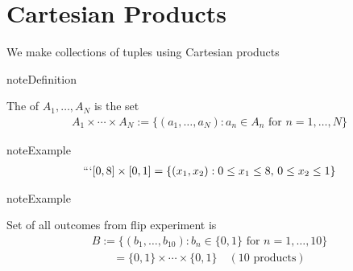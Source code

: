 \documentclass[letterpaper,10pt,english]{jupyterBook}
\begin{document}
\section{Cartesian Products}
\label{\detokenize{03.set_theory:cartesian-products}}
\sphinxAtStartPar
We make collections of tuples using Cartesian products

\begin{sphinxadmonition}{note}{Definition}

\sphinxAtStartPar
The  of \(A_1, \ldots, A_N\) is the set
\begin{equation*}
\begin{split}
A_1 \times \cdots \times A_N
:= \{ (a_1, \ldots, a_N) : a_n \in A_n \text{ for } n =1, \ldots, N \}
\end{split}
\end{equation*}\end{sphinxadmonition}

\begin{sphinxadmonition}{note}{Example}
\begin{equation*}
\begin{split}
```[0, 8] \times [0, 1] = \{ (x_1,x_2) : 0 \leq x_1 \leq 8, \, 0 \leq x_2 \leq 1 \}
\end{split}
\end{equation*}\end{sphinxadmonition}

\begin{figure}[htbp]
\centering

\noindent{}
\end{figure}

\begin{sphinxadmonition}{note}{Example}

\sphinxAtStartPar
Set of all outcomes from flip experiment is
\begin{equation*}
\begin{split}
B := \Big\{ (b_1, \ldots, b_{10}) : b_n \in \{0, 1\} \text{ for } n = 1, \ldots, 10 \Big\}
\end{split}
\end{equation*}\begin{equation*}
\begin{split}
= \{0, 1\} \times \cdots \times \{0, 1\} \quad (10 \text{ products})
\end{split}
\end{equation*}\end{sphinxadmonition}
\end{document}
